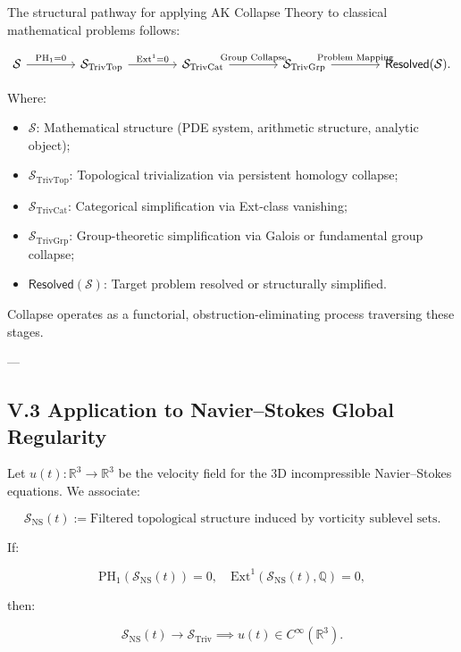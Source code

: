 \documentclass[11pt]{article}
\begin{document}
The structural pathway for applying AK Collapse Theory to classical mathematical problems follows:

\[
\begin{tikzcd}[column sep=4em]
\mathcal{S} \arrow[r, "\mathrm{PH}_1 = 0"]
& \mathcal{S}_{\mathrm{TrivTop}} \arrow[r, "\mathrm{Ext}^1 = 0"]
& \mathcal{S}_{\mathrm{TrivCat}} \arrow[r, "\text{Group Collapse}"]
& \mathcal{S}_{\mathrm{TrivGrp}} \arrow[r, "\text{Problem Mapping}"]
& \mathsf{Resolved}(\mathcal{S}).
\end{tikzcd}
\]

Where:
\begin{itemize}
    \item $\mathcal{S}$: Mathematical structure (PDE system, arithmetic structure, analytic object);
    \item $\mathcal{S}_{\mathrm{TrivTop}}$: Topological trivialization via persistent homology collapse;
    \item $\mathcal{S}_{\mathrm{TrivCat}}$: Categorical simplification via Ext-class vanishing;
    \item $\mathcal{S}_{\mathrm{TrivGrp}}$: Group-theoretic simplification via Galois or fundamental group collapse;
    \item $\mathsf{Resolved}(\mathcal{S})$: Target problem resolved or structurally simplified.
\end{itemize}

Collapse operates as a functorial, obstruction-eliminating process traversing these stages.

---

\subsection*{V.3 Application to Navier–Stokes Global Regularity}

Let $u(t) : \mathbb{R}^3 \to \mathbb{R}^3$ be the velocity field for the 3D incompressible Navier–Stokes equations.  
We associate:

\[
\mathcal{S}_{\mathrm{NS}}(t) := \text{Filtered topological structure induced by vorticity sublevel sets.}
\]

If:

\[
\mathrm{PH}_1(\mathcal{S}_{\mathrm{NS}}(t)) = 0, \quad \mathrm{Ext}^1(\mathcal{S}_{\mathrm{NS}}(t), \mathbb{Q}) = 0,
\]

then:

\[
\mathcal{S}_{\mathrm{NS}}(t) \longrightarrow \mathcal{S}_{\mathrm{Triv}} \implies u(t) \in C^\infty(\mathbb{R}^3).
\]
\end{document}
